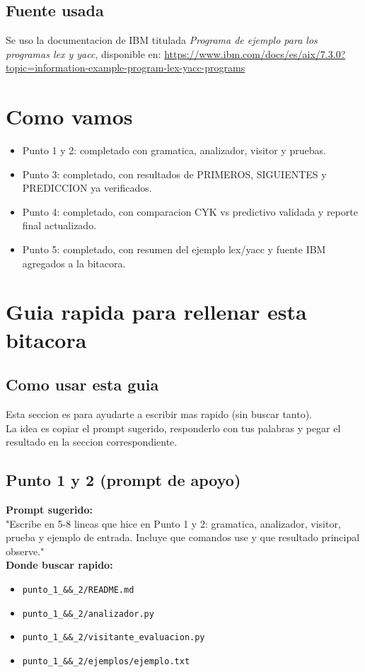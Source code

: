 \documentclass[12pt,a4paper]{article}
\begin{document}
\subsection*{Fuente usada}
Se uso la documentacion de IBM titulada \textit{Programa de ejemplo para los programas lex y yacc}, disponible en: \url{https://www.ibm.com/docs/es/aix/7.3.0?topic=information-example-program-lex-yacc-programs}

\section{Como vamos}
\begin{itemize}
    \item Punto 1 y 2: completado con gramatica, analizador, visitor y pruebas.
    \item Punto 3: completado, con resultados de PRIMEROS, SIGUIENTES y PREDICCION ya verificados.
    \item Punto 4: completado, con comparacion CYK vs predictivo validada y reporte final actualizado.
    \item Punto 5: completado, con resumen del ejemplo lex/yacc y fuente IBM agregados a la bitacora.
\end{itemize}

\section{Guia rapida para rellenar esta bitacora}
\subsection*{Como usar esta guia}
Esta seccion es para ayudarte a escribir mas rapido (sin buscar tanto).\\
La idea es copiar el prompt sugerido, responderlo con tus palabras y pegar el resultado en la seccion correspondiente.

\subsection*{Punto 1 y 2 (prompt de apoyo)}
\textbf{Prompt sugerido:} \\
"Escribe en 5-8 lineas que hice en Punto 1 y 2: gramatica, analizador, visitor, prueba y ejemplo de entrada. Incluye que comandos use y que resultado principal observe."\\
\textbf{Donde buscar rapido:}
\begin{itemize}
    \item \texttt{punto\_1\_\&\&\_2/README.md}
    \item \texttt{punto\_1\_\&\&\_2/analizador.py}
    \item \texttt{punto\_1\_\&\&\_2/visitante\_evaluacion.py}
    \item \texttt{punto\_1\_\&\&\_2/ejemplos/ejemplo.txt}
\end{itemize}
\end{document}
